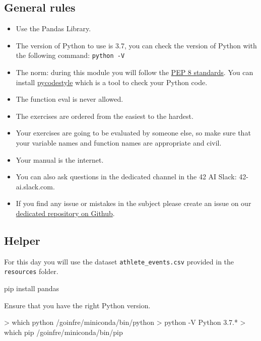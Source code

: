 \documentclass[]{article}
\newenvironment{Shaded}{\begin{snugshade}}{\end{snugshade}}
\newcommand{\NormalTok}[1]{\textcolor[rgb]{0.81,0.81,0.76}{#1}}
\begin{document}
\hypertarget{general-rules}{%
\subsection{General rules}\label{general-rules}}

\begin{itemize}
\item
  Use the Pandas Library.
\item
  The version of Python to use is 3.7, you can check the version of
  Python with the following command: \texttt{python\ -V}
\item
  The norm: during this module you will follow the
  \href{https://www.python.org/dev/peps/pep-0008/}{PEP 8 standards}. You
  can install \href{https://pypi.org/project/pycodestyle}{pycodestyle}
  which is a tool to check your Python code.
\item
  The function eval is never allowed.
\item
  The exercises are ordered from the easiest to the hardest.
\item
  Your exercises are going to be evaluated by someone else, so make sure
  that your variable names and function names are appropriate and civil.
\item
  Your manual is the internet.
\item
  You can also ask questions in the dedicated channel in the 42 AI
  Slack: 42-ai.slack.com.
\item
  If you find any issue or mistakes in the subject please create an
  issue on our
  \href{https://github.com/42-AI/bootcamp_python/issues}{dedicated
  repository on Github}.
\end{itemize}

\hypertarget{helper}{%
\subsection{Helper}\label{helper}}

For this day you will use the dataset \texttt{athlete\_events.csv}
provided in the \texttt{resources} folder.

\begin{Shaded}
\begin{Highlighting}[]
\NormalTok{pip install pandas}
\end{Highlighting}
\end{Shaded}

Ensure that you have the right Python version.

\begin{Shaded}
\begin{Highlighting}[]
\NormalTok{> which python}
\NormalTok{/goinfre/miniconda/bin/python}
\NormalTok{> python -V}
\NormalTok{Python 3.7.*}
\NormalTok{> which pip}
\NormalTok{/goinfre/miniconda/bin/pip}
\end{Highlighting}
\end{Shaded}
\end{document}

